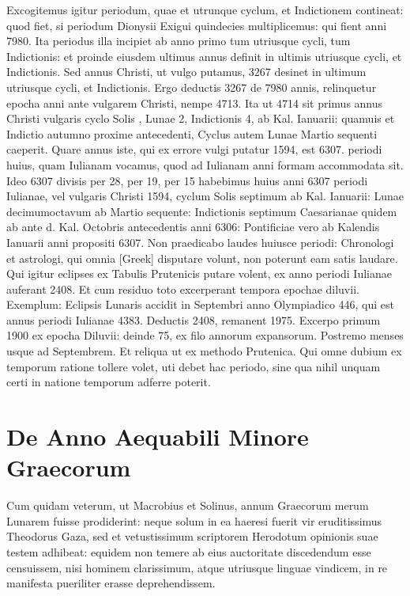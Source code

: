 Excogitemus igitur periodum,
quae et utrunque cyclum, et Indictionem contineat: quod fiet, si periodum
Dionysii Exigui quindecies multiplicemus: qui fient anni
7980.
Ita periodus illa incipiet ab anno primo tum utriusque cycli,
tum Indictionis: et proinde eiusdem ultimus annus definit in ultimis
utriusque cycli, et Indictionis.
Sed annus Christi, ut vulgo putamus,
3267 desinet in ultimum utriusque cycli, et Indictionis.
Ergo deductis
3267 de 7980 annis, relinquetur epocha anni ante vulgarem
Christi, nempe 4713.
Ita ut 4714 sit primus annus Christi vulgaris cyclo
Solis , Lunae 2, Indictionis 4, ab Kal. Ianuarii: quamuis et Indictio
autumno proxime antecedenti, Cyclus autem Lunae Martio sequenti
caeperit.
Quare annus iste, qui ex errore vulgi putatur 1594, est 6307.
periodi huius, quam Iulianam vocamus, quod ad Iulianam anni formam
accommodata sit.
Ideo 6307 divisis per 28, per 19, per 15 habebimus
huius anni 6307 periodi Iulianae, vel vulgaris Christi 1594, cyclum
Solis septimum ab Kal. Ianuarii:
Lunae decimumoctavum ab
Martio sequente:
Indictionis septimum Caesarianae quidem ab ante d.
 Kal. Octobris antecedentis anni 6306:
Pontificiae vero ab Kalendis
Ianuarii anni propositi 6307.
Non praedicabo laudes huiusce periodi:
Chronologi et astrologi, qui omnia \textgreek{[Greek]} disputare volunt,
non poterunt eam satis laudare.
Qui igitur eclipses ex Tabulis
Prutenicis putare volent, ex anno periodi Iulianae auferant 2408.
Et
cum residuo toto excerperant tempora epochae diluvii.
Exemplum: Eclipsis
Lunaris accidit in Septembri anno Olympiadico 446, qui est annus
periodi Iulianae 4383.
Deductis 2408, remanent 1975.
Excerpo
primum 1900 ex epocha Diluvii: deinde 75, ex filo annorum expansorum.
Postremo menses usque ad Septembrem.
Et reliqua ut ex methodo
Prutenica.
Qui omne dubium ex temporum ratione tollere
volet, uti debet hac periodo, sine qua nihil unquam certi in natione
temporum adferre poterit.

\section{De Anno Aequabili Minore Graecorum}
Cum quidam veterum, ut Macrobius et Solinus, annum Graecorum
merum Lunarem fuisse prodiderint:
neque solum in ea
haeresi fuerit vir eruditissimus Theodorus Gaza, sed et vetustissimum
scriptorem Herodotum opinionis suae testem adhibeat:
equidem non
temere ab eius auctoritate discedendum esse censuissem, nisi hominem
clarissimum, atque utriusque linguae vindicem, in re manifesta
pueriliter erasse deprehendissem.

